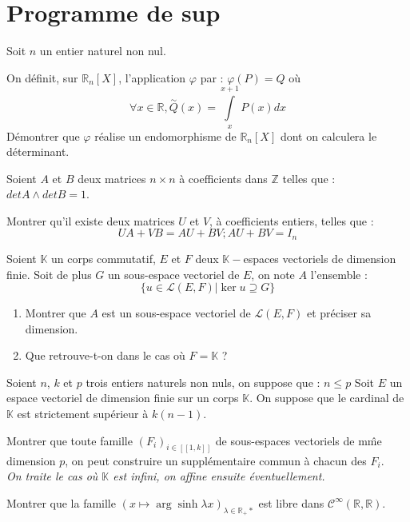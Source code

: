 \section{Programme de sup}

\begin{exer}
Soit $n$ un entier naturel non nul.

On d\'efinit, sur $\mathbb{R}_n[X]$, l'application $\varphi$ par : $\varphi (P) = Q$ o\`u
\[\forall x \in\mathbb{R} , \overset{\sim}{Q}(x)=\int\limits_x^{x+1}P(x)dx\]
D\'emontrer que $\varphi$ r\'ealise un endomorphisme de $\mathbb{R}_n[X]$ dont on calculera le d\'eterminant.
\end{exer}

\begin{exer}
Soient $A$ et $B$ deux matrices $n\times n$ \`a coefficients dans $\mathbb{Z}$ telles que : $det A \wedge det B = 1$.

Montrer qu'il existe deux matrices $U$ et $V$, \`a coefficients entiers, telles que :\[UA+VB=AU+BV ; AU+BV=I_n\]
\end{exer}

\begin{exer}
Soient $\mathbb{K}$ un corps commutatif, $E$ et $F$ deux $\mathbb{K}-$espaces vectoriels de dimension finie. %
Soit de plus $G$ un sous-espace vectoriel de $E$, on note $A$ l'ensemble :\[\{u\in\mathcal{L}(E,F) |\ker u\supseteq G\}\]
\begin{enumerate}
\item Montrer que $A$ est un sous-espace vectoriel de $\mathcal{L}(E,F)$ et pr\'eciser sa dimension.
\item Que retrouve-t-on dans le cas o\`u $F=\mathbb{K}$ ?
\end{enumerate}
\end{exer}

\begin{exer}
Soient $n$, $k$ et $p$ trois entiers naturels non nuls, on suppose que : $n\leq p$ %
Soit $E$ un espace vectoriel de dimension finie sur un corps $\mathbb{K}$. On suppose que le cardinal de $\mathbb{K}$ est strictement sup\'erieur \`a $k(n-1)$.

Montrer que toute famille $(F_i)_{i\in [\![1,k]\!]}$ de sous-espaces vectoriels de m\^me dimension $p$, on peut construire un suppl\'ementaire commun \`a chacun des $F_i$.\\
\textit{On traite le cas o\`u $\mathbb{K}$ est infini, on affine ensuite \'eventuellement.}
\end{exer}

\begin{exer}
Montrer que la famille $(x\mapsto\arg\sinh \lambda x)_{\lambda\in\mathbb{R}_+{\ast}}$ est libre %
dans $\mathcal{C}^{\infty}(\mathbb{R},\mathbb{R})$.
\end{exer}